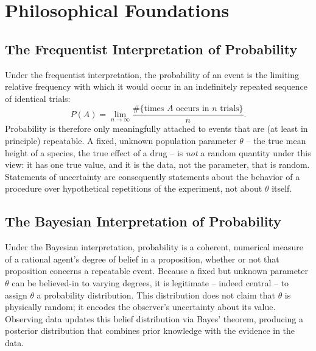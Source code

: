 \documentclass[11pt,a4paper]{article}
\begin{document}
\section{Philosophical Foundations}

\subsection{The Frequentist Interpretation of Probability}
Under the frequentist interpretation, the probability of an event is the limiting relative frequency with which it would occur in an indefinitely repeated sequence of identical trials:
\begin{equation}
P(A) = \lim_{n \to \infty} \frac{\#\{\text{times } A \text{ occurs in } n \text{ trials}\}}{n}.
\end{equation}
Probability is therefore only meaningfully attached to events that are (at least in principle) repeatable. A fixed, unknown population parameter $\theta$ -- the true mean height of a species, the true effect of a drug -- is \emph{not} a random quantity under this view: it has one true value, and it is the data, not the parameter, that is random. Statements of uncertainty are consequently statements about the behavior of a procedure over hypothetical repetitions of the experiment, not about $\theta$ itself.

\subsection{The Bayesian Interpretation of Probability}
Under the Bayesian interpretation, probability is a coherent, numerical measure of a rational agent's degree of belief in a proposition, whether or not that proposition concerns a repeatable event. Because a fixed but unknown parameter $\theta$ can be believed-in to varying degrees, it is legitimate -- indeed central -- to assign $\theta$ a probability distribution. This distribution does not claim that $\theta$ is physically random; it encodes the observer's uncertainty about its value. Observing data updates this belief distribution via Bayes' theorem, producing a posterior distribution that combines prior knowledge with the evidence in the data.
\end{document}
